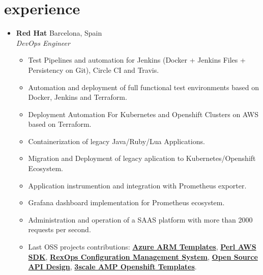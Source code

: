 \documentclass[]{friggeri-cv} %
\renewenvironment{entrylist}{%
  \begin{itemize}[leftmargin=1in]%
}{%
  \end{itemize}
}
\renewcommand{\entry}[4]{%
  \item[#1]
    \textbf{#2}%
    \hfill%
    {\footnotesize\addfontfeature{Color=lightgray} #3}\\%
    #4\vspace{\parsep}%
  }
\begin{document}
\section{experience}
\begin{entrylist}

\entry
{2017--2018}
{Red Hat}
{Barcelona, Spain}
{\emph{DevOps Engineer} 
\begin{itemize}[label=\textbullet]
    \item Test Pipelines and automation for Jenkins (Docker + Jenkins Files + Persistency on Git), Circle CI and Travis.
    \item Automation and deployment of full functional test environments based on Docker, Jenkins and Terraform.
    \item Deployment Automation For Kubernetes and Openshift Clusters on AWS based on Terraform.
    \item Containerization of legacy Java/Ruby/Lua Applications.
    \item Migration and Deployment of legacy aplication to Kubernetes/Openshift Ecosystem.
    \item Application instrumention and integration with Prometheus exporter. 
    \item Grafana dashboard implementation for Prometheus ecosystem. 
    \item Administration and operation of a SAAS platform with more than 2000 requests per second.
    \item Last OSS projects contributions: \href{https://github.com/Azure/azure-quickstart-templates}{\textbf{Azure ARM Templates}}, \href{https://github.com/pplu/aws-sdk-perl}{\textbf{Perl AWS SDK}}, \href{https://github.com/RexOps/Rex}{\textbf{RexOps Configuration Management System}}, \href{https://github.com/Apicurio/apicurio-studio}{\textbf{Open Source API Design}}, \href{https://github.com/3scale/3scale-amp-openshift-templates}{\textbf{3scale AMP Openshift Templates}}.
\end{itemize}}


\end{entrylist}
\end{document}
